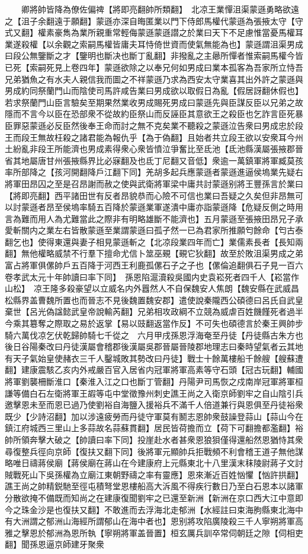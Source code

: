 　　卿將帥皆降為僚佐偏禆【將即亮翻帥所類翻】　北凉王業憚沮渠蒙遜勇略欲遠之【沮子余翻遠于願翻】蒙遜亦深自晦匿業以門下侍郎馬權代蒙遜為張掖太守【守式又翻】權素豪雋為業所親重常輕侮蒙遜蒙遜譛之於業曰天下不足慮惟當憂馬權耳業遂殺權【以余觀之索嗣馬權皆庸夫耳恃倚世資而使氣無能為也】蒙遜謂沮渠男成曰段公無鑒斷之才【鑒明也斷决也斷丁亂翻】非撥亂之主曏所憚者惟索嗣馬權今皆已死【索嗣死見上卷四年】蒙遜欲除之以奉兄何如男成曰業本孤客為吾家所立恃吾兄弟猶魚之有水夫人親信我而圖之不祥蒙遜乃求為西安太守業喜其出外許之蒙遜與男成約同祭蘭門山而陰使司馬許咸告業曰男成欲以取假日為亂【假居訝翻休假也】若求祭蘭門山臣言驗矣至期果然業收男成賜死男成曰蒙遜先與臣謀反臣以兄弟之故隱而不言今以臣在恐部衆不從故約臣祭山而反誣臣其意欲王之殺臣也乞詐言臣死暴臣罪惡蒙遜必反臣然後奉王命而討之無不克矣業不聽殺之蒙遜泣告衆曰男成忠於段王而段王無故枉殺之諸君能為報仇乎【為于偽翻】且始者共立段王欲以安衆耳今州土紛亂非段王所能濟也男成素得衆心衆皆憤泣爭奮比至氐池【氐池縣漢屬張掖郡晉省其地屬唐甘州張掖縣界比必寐翻及也氐丁尼翻又音低】衆逾一萬鎮軍將軍臧莫孩率所部降之【孩河開翻降戶江翻下同】羌胡多起兵應蒙遜者蒙遜進逼侯塢業先疑右將軍田昂囚之至是召昂謝而赦之使與武衛將軍梁中庸共討蒙遜别將王豐孫言於業曰【將即亮翻】西平諸田世有反者昂貌恭而心險不可信也業曰吾疑之久矣但非昂無可以討蒙遜者昂至侯塢率騎五百降於蒙遜業軍遂潰中庸亦詣蒙遜降【危疑反側之時用言為難而用人為尤難當此之際非有明略雄斷不能濟也】五月蒙遜至張掖田昂兄子承愛斬關内之業左右皆散蒙遜至業謂蒙遜曰孤孑然一已為君家所推願匄餘命【匄古泰翻乞也】使得東還與妻子相見蒙遜斬之【北凉段業四年而亡】業儒素長者【長知兩翻】無他權略威禁不行羣下擅命尤信卜筮巫覡【覡它狄翻】故至於敗沮渠男成之弟富占將軍俱傫帥戶五百降于河西王利鹿孤傫石子之子也【傫倫追翻俱石子見一百六卷孝武太元十年帥讀曰率下同】　孫恩陷滬瀆殺吳國内史袁崧死者四千人【崧當作山松】　凉王隆多殺豪望以立威名内外囂然人不自保魏安人焦朗【魏安縣在武威昌松縣界盖曹魏所置也而晉志不見後魏置魏安郡】遣使說秦隴西公碩德曰呂氏自武皇棄世【呂光偽諡懿武皇帝說輸芮翻】兄弟相攻政綱不立競為威虐百姓饑饉死者過半今乘其簒奪之際取之易於返掌【易以豉翻返當作反】不可失也碩德言於秦王興帥步騎六萬伐凉乞伏乾歸帥騎七千從之　六月甲戌孫恩浮海奄至丹徒【丹徒縣古朱方也後日谷陽秦改曰丹徒漢屬會稽郡後漢屬吳郡晉屬晉陵郡地理志曰秦時望氣者云其地有天子氣始皇使赭衣三千人鑿城敗其勢改曰丹徒】戰士十餘萬樓船千餘艘【艘蘇遭翻】建康震駭乙亥内外戒嚴百官入居省内冠軍將軍高素等守石頭【冠古玩翻】輔國將軍劉襲柵斷淮口【秦淮入江之口也斷丁管翻】丹陽尹司馬恢之戍南岸冠軍將軍桓謙等備白石左衛將軍王嘏等屯中堂徵豫州刺史譙王尚之入衛京師劉牢之自山陰引兵邀擊恩未至而恩已過乃使劉裕自海鹽入援裕兵不滿千人倍道兼行與恩俱至丹徒裕衆既少【少詩沼翻】加以涉遠疲勞而丹徒守軍莫有鬭志恩帥衆鼓譟登蒜山【蒜山今在鎮江府城西三里山上多蒜故名蒜蘇貫翻】居民皆荷擔而立【荷下可翻擔都濫翻】裕帥所領奔擊大破之【帥讀曰率下同】投崖赴水者甚衆恩狼狽僅得還船然恩猶恃其衆尋復整兵徑向京師【復扶又翻下同】後將軍元顯帥兵拒戰頻不利會稽王道子無他謀略唯日禱蔣侯廟【蔣侯廟在蔣山在今建康府上元縣東北十八里漢末秣陵尉蔣子文討賊戰死山下吳孫權為立廟江東朝野禱之率有靈應】恩來漸近百姓忷懼【忷許拱翻】譙王尚之帥精鋭馳至徑屯積弩堂恩樓船高大泝風不得疾行數日乃至白石恩本以諸軍分散欲掩不備既而知尚之在建康復聞劉牢之已還至新洲【新洲在京口西大江中意即今之珠金沙是也復扶又翻】不敢進而去浮海北走郁洲【水經註曰束海朐縣東北海中有大洲謂之郁洲山海經所謂郁山在海中者也】恩别將攻陷廣陵殺三千人寧朔將軍高雅之擊恩於郁洲為恩所執【寧朔將軍盖晉置】桓玄厲兵訓卒常伺朝廷之隙【伺相吏翻】聞孫恩逼京師建牙聚衆